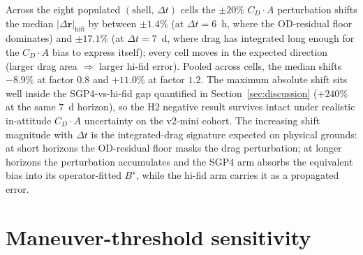 \documentclass[10pt, letterpaper]{article}
\begin{document}
\begin{table}[ht]
  \centering
  \caption{Median high-fidelity position error
  $|\Delta\mathbf{r}|_{\mathrm{hifi}}$ for the v2-mini cohort by
  altitude shell and $\Delta t$ bucket, at the three $C_D \cdot A$
  scaling factors $\{0.8,\,1.0,\,1.2\}$ relative to the
  Section~\ref{sec:methods-attitude} baseline.
  The $0.8\times$ and $1.2\times$ columns report the median expressed as a
  relative shift versus the baseline. The 540~km shell is absent because
  the corpus has no v2-mini satellites at that altitude
  (Table~\ref{tab:corpus}).}
  \label{tab:cda-sensitivity}
  
\end{table}

Across the eight populated $(\mathrm{shell},\,\Delta t)$ cells the
$\pm 20\%$ $C_D \cdot A$ perturbation shifts the median
$|\Delta\mathbf{r}|_{\mathrm{hifi}}$ by between $\pm 1.4\%$ (at
$\Delta t = 6$~h, where the OD-residual floor dominates) and
$\pm 17.1\%$ (at $\Delta t = 7$~d, where drag has integrated long
enough for the $C_D \cdot A$ bias to express itself); every cell
moves in the expected direction (larger drag area
$\Rightarrow$ larger hi-fid error). Pooled across cells, the median
shifts $-8.9\%$ at factor $0.8$ and $+11.0\%$ at factor $1.2$. The
maximum absolute shift sits well inside the SGP4-vs-hi-fid gap
quantified in Section~\ref{sec:discussion}
($+240\%$ at the same $7$~d horizon), so the H2 negative result
survives intact under realistic in-attitude $C_D \cdot A$
uncertainty on the v2-mini cohort. The increasing shift magnitude
with $\Delta t$ is the integrated-drag signature expected on
physical grounds: at short horizons the OD-residual floor masks
the drag perturbation; at longer horizons the perturbation
accumulates and the SGP4 arm absorbs the equivalent bias into its
operator-fitted $B^{\!\star}$, while the hi-fid arm carries it as
a propagated error.

\section{Maneuver-threshold sensitivity}
\label{app:maneuver-threshold-sensitivity}
\end{document}
